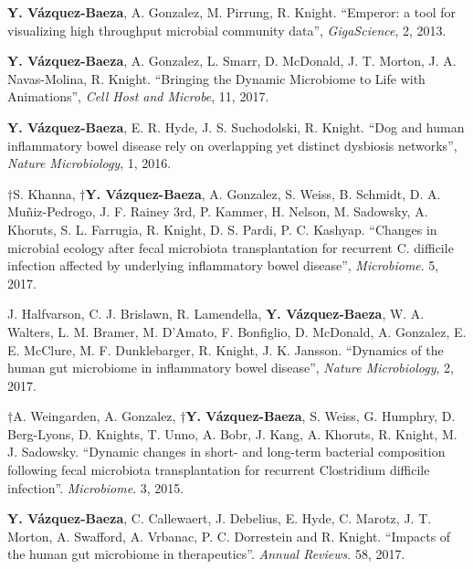 \begin{frontmatter}
\begin{vitapage}
\begin{publications}
    \item \textbf{Y. V\'azquez-Baeza}, A. Gonzalez, M. Pirrung, R. Knight. ``Emperor: a tool for visualizing high throughput microbial community data'', \emph{GigaScience}, 2, 2013.

    \item \textbf{Y. V\'azquez-Baeza}, A. Gonzalez, L. Smarr, D. McDonald, J. T. Morton, J. A. Navas-Molina, R. Knight. ``Bringing the Dynamic Microbiome to Life with Animations'', \emph{Cell Host and Microbe}, 11, 2017.

    \item \textbf{Y. V\'azquez-Baeza}, E. R. Hyde, J. S. Suchodolski, R. Knight. ``Dog and human inflammatory bowel disease rely on overlapping yet distinct dysbiosis networks'', \emph{Nature Microbiology}, 1, 2016.

    \item  $\dagger$S. Khanna, \textbf{$\dagger$Y. V\'azquez-Baeza}, A.  
        Gonzalez, S. Weiss, B. Schmidt, D. A. Muñiz-Pedrogo, J. F. Rainey 3rd, 
        P. Kammer, H. Nelson, M. Sadowsky, A. Khoruts, S. L. Farrugia, R.  
        Knight, D. S. Pardi, P. C. Kashyap. ``Changes in microbial ecology 
        after fecal microbiota transplantation for recurrent C. difficile 
        infection affected by underlying inflammatory bowel disease'', 
        \emph{Microbiome}. 5, 2017.

    \item J. Halfvarson, C. J. Brislawn, R. Lamendella, \textbf{Y. V\'azquez-Baeza}, W. A. Walters, L. M. Bramer, M. D'Amato, F. Bonfiglio, D. McDonald, A. Gonzalez, E. E. McClure, M. F. Dunklebarger, R. Knight, J. K. Jansson. ``Dynamics of the human gut microbiome in inflammatory bowel disease'', \emph{Nature Microbiology}, 2, 2017.
  
    \item $\dagger$A. Weingarden, A. Gonzalez, \textbf{$\dagger$Y.  
        V\'azquez-Baeza}, S. Weiss, G. Humphry, D. Berg-Lyons, D. Knights, T.  
        Unno, A. Bobr, J. Kang, A. Khoruts, R. Knight, M. J. Sadowsky.  
        ``Dynamic changes in short- and long-term bacterial composition 
        following fecal microbiota transplantation for recurrent Clostridium 
        difficile infection''. \emph{Microbiome}. 3, 2015.

    \item \textbf{Y. V\'azquez-Baeza}, C. Callewaert, J. Debelius, E. Hyde, C. Marotz, J. T. Morton, A. Swafford, A. Vrbanac, P. C. Dorrestein and R. Knight. ``Impacts of the human gut microbiome in therapeutics''. \emph{Annual Reviews}. 58, 2017.


\end{publications}
\end{vitapage}
\end{frontmatter}
